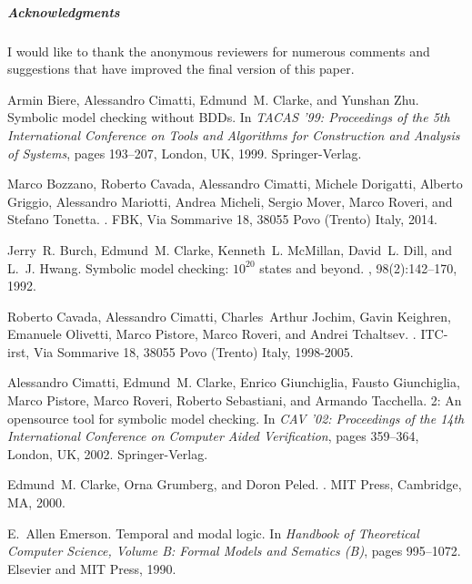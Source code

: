 \documentclass[a4paper,UKenglish]{lipics}
\begin{document}
\subparagraph*{Acknowledgments}
I would like to thank the anonymous reviewers for numerous comments and suggestions that have improved the final version of this paper.









\begin{thebibliography}{1}

Armin Biere, Alessandro Cimatti, Edmund~M. Clarke, and Yunshan Zhu.
\newblock Symbolic model checking without {BDDs}.
\newblock In {\em TACAS '99: Proceedings of the 5th International Conference on
  Tools and Algorithms for Construction and Analysis of Systems}, pages
  193--207, London, UK, 1999. Springer-Verlag.

Marco Bozzano, Roberto Cavada, Alessandro Cimatti, Michele Dorigatti, Alberto
  Griggio, Alessandro Mariotti, Andrea Micheli, Sergio Mover, Marco Roveri, and
  Stefano Tonetta.
.
\newblock FBK, Via Sommarive 18, 38055 Povo (Trento) Italy, 2014.

Jerry~R. Burch, Edmund~M. Clarke, Kenneth~L. McMillan, David~L. Dill, and L.~J.
  Hwang.
\newblock Symbolic model checking: $10^{20}$ states and beyond.
, 98(2):142--170, 1992.

Roberto Cavada, Alessandro Cimatti, Charles~Arthur Jochim, Gavin Keighren,
  Emanuele Olivetti, Marco Pistore, Marco Roveri, and Andrei Tchaltsev.
.
\newblock ITC-irst, Via Sommarive 18, 38055 Povo (Trento) Italy, 1998-2005.

Alessandro Cimatti, Edmund~M. Clarke, Enrico Giunchiglia, Fausto Giunchiglia,
  Marco Pistore, Marco Roveri, Roberto Sebastiani, and Armando Tacchella.
 2: An opensource tool for symbolic model checking.
\newblock In {\em CAV '02: Proceedings of the 14th International Conference on
  Computer Aided Verification}, pages 359--364, London, UK, 2002.
  Springer-Verlag.

Edmund~M. Clarke, Orna Grumberg, and Doron Peled.
.
\newblock MIT Press, Cambridge, MA, 2000.

E.~Allen Emerson.
\newblock Temporal and modal logic.
\newblock In {\em Handbook of Theoretical Computer Science, Volume B: Formal
  Models and Sematics (B)}, pages 995--1072. Elsevier and MIT Press, 1990.


\end{thebibliography}
\end{document}
